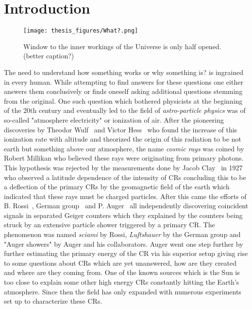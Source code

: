 
\chapter{Introduction}
\label{sec:intro}
\begin{figure}[h!]
\centering
  \texttt{[image: thesis\_figures/What?.png]}
\caption{Window to the inner workings of the Universe is only half opened. (better caption?)}
\label{fig:intro}
\end{figure}
The need to understand how something works or why something is? is ingrained in every human. While attempting to find answers for these questions one either answers them conclusively or finds oneself asking additional questions stemming from the original. One such question which bothered physicists at the beginning of the 20th century and eventually led to the field of \textit{astro-particle physics} was of so-called "atmosphere electricity" or ionization of air. After the pioneering discoveries by Theodor Wulf~\cite{article_Wulf} and Victor Hess~\cite{Hess:1912srp} who found the increase of this ionization rate with altitude and theorized the origin of this radiation to be not earth but something above our atmosphere, the name \textit{cosmic rays} was coined by Robert Millikan who believed these rays were originating from primary photons. This hypothesis was rejected by the measurements done by Jacob Clay~\cite{Clay:1927I,Clay:1928II} in 1927 who observed a latitude dependence of the intensity of \glspl{CR} concluding this to be a deflection of the primary \glspl{CR} by the geomagnetic field of the earth which indicated that these rays must be charged particles. After this came the efforts of B. Rossi~\cite{rossi1933eigenschaften}, German group~\cite{schmeiser1938harten} and P. Auger~\cite{RevModPhys.11.288} all independently discovering coincident signals in separated Geiger counters which they explained by the counters being struck by an extensive particle shower triggered by a primary \gls{CR}. The phenomenon was named \textit{sciami} by Rossi, \textit{Luftshauer} by the German group and "Auger showers" by Auger and his collaborators. Auger went one step further by further estimating the primary energy of the \gls{CR} via his superior setup giving rise to some questions about \glspl{CR} which are yet unanswered, how are they created and where are they coming from. One of the known sources which is the Sun is too close to explain some other high energy \glspl{CR} constantly hitting the Earth's atmosphere. Since then the field has only expanded with numerous experiments set up to characterize these \glspl{CR}. 

